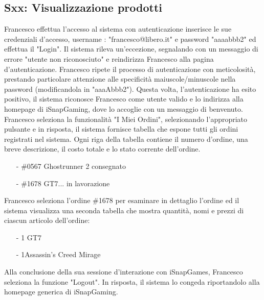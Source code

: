 \documentclass[12pt, a4paper, oneside]{book}
\begin{document}
    \subsection*{Sxx: Visualizzazione prodotti}
    Francesco effettua l'accesso al sistema con autenticazione inserisce  le sue credenziali d'accesso, username :
     "francesco@libero.it" e password "aaaabbb2" ed effettua il "Login". Il sistema rileva un'eccezione, segnalando con un
    messaggio di errore "utente non riconosciuto" e reindirizza Francesco alla pagina d'autenticazione. Francesco ripete
    il processo di autenticazione con meticolosità, prestando particolare attenzione alle specificità maiuscole/minuscole
    nella password (modificandola in "aaaAbbb2"). Questa volta, l'autenticazione ha esito positivo, il sistema riconosce
    Francesco come utente valido e lo indirizza alla homepage di iSnapGaming, dove lo accoglie con un messaggio di benvenuto.
    Francesco seleziona la funzionalità "I Miei Ordini", selezionando l'appropriato pulsante e in risposta, il sistema
    fornisce tabella che espone tutti gli ordini registrati nel sistema. Ogni riga della tabella contiene il numero
    d'ordine, una breve descrizione, il costo totale e lo stato corrente dell'ordine.
    \begin{itemize}
        \item [-] \#0567 Ghostrunner 2 		consegnato
        \item [-] \#1678 GT7... 	in lavorazione
    \end{itemize}
    Francesco seleziona l'ordine \#1678 per esaminare in dettaglio l'ordine ed il  sistema visualizza una seconda tabella
    che mostra quantità, nomi e prezzi di ciascun articolo dell'ordine:
    \begin{itemize}
        \setlength\itemsep{.05cm}
        \item [-] 1	GT7 
        \item [-] 1Assassin's Creed Mirage	
    \end{itemize}
    Alla conclusione della sua sessione d'interazione con iSnapGames, Francesco seleziona la funzione
    "Logout". In risposta, il sistema lo congeda riportandolo alla homepage generica di iSnapGaming.
\end{document}
